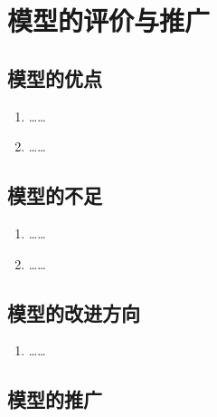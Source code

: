\section{模型的评价与推广}

\subsection{模型的优点}

\begin{enumerate}
  \item ……
  \item ……
\end{enumerate}

\subsection{模型的不足}

\begin{enumerate}
  \item ……
  \item ……
\end{enumerate}

\subsection{模型的改进方向}

\begin{enumerate}
  \item ……
\end{enumerate}

\subsection{模型的推广}

